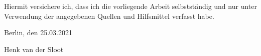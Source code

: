 
Hiermit versichere ich, dass ich die vorliegende Arbeit selbstständig und nur unter Verwendung der angegebenen Quellen und Hilfsmittel verfasst habe.

\vskip 1cm

Berlin, den 25.03.2021

\vskip 1.5cm

Henk van der Sloot
